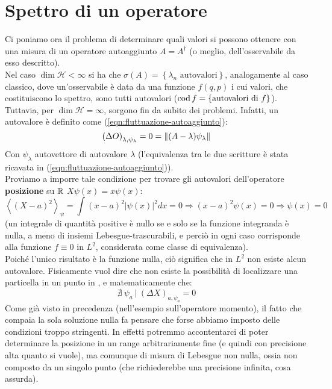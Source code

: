 \documentclass[../../FisicaTeorica.tex]{subfiles}
\begin{document}
\section{Spettro di un operatore}
Ci poniamo ora il problema di determinare quali valori si possono ottenere con una misura di un operatore autoaggiunto $A=A^\dag$ (o meglio, dell'osservabile da esso descritto).\\
Nel caso $\dim{\mathcal{H}}<\infty$ si ha che $\sigma \left(A\right)= \left\{\lambda_n\text{ autovalori}\right\}$, analogamente al caso classico, dove un'osservabile è data da una funzione $f(q,p)$ i cui valori, che costituiscono lo spettro, sono tutti autovalori ($\operatorname{cod} f = \{\text{autovalori di }f\}$).\\
Tuttavia, per $\dim{\mathcal{H}}=\infty$, sorgono fin da subito dei problemi.  Infatti, un autovalore è definito come (\ref{eqn:fluttuazione-autoaggiunto}):
\[
\left(\Delta O\right)_{\lambda,\psi_\lambda}=0 = \left\lVert(A-\lambda)\psi_\lambda\right\rVert
\]
Con $\psi_\lambda$ autovettore di autovalore $\lambda$ 
(l'equivalenza tra le due scritture è stata ricavata in (\ref{eqn:fluttuazione-autoaggiunto})).\\
Proviamo a imporre tale condizione per trovare gli autovalori dell'operatore \textbf{posizione} su $\mathbb{R}$ $X\psi \left(x\right)=x\psi (x)$:
\[
\left\langle\left(X-a\right)^2\right\rangle_\psi=\int \left(x-a\right)^2\left|\psi\left(x\right)\right|^2dx=0\Rightarrow \left(x-a\right)^2\psi \left(x\right)=0\Rightarrow  \psi \left(x\right)=0 
\]
(un integrale di quantità positive è nullo se e solo se la funzione integranda è nulla, a meno di insiemi Lebesgue-trascurabili, e perciò in ogni caso corrisponde alla funzione $f\equiv 0$ in $L^2$, considerata come classe di equivalenza).\\
Poiché l'unico risultato è la funzione nulla, ciò significa che in $L^2$ non esiste alcun autovalore. Fisicamente vuol dire che non esiste la possibilità di localizzare una particella in un punto in \MQ, e matematicamente che:
\[
\nexists\> \psi_a\>|\> \left(\Delta X\right)_{a,\psi_a}=0
\]
Come già visto in precedenza (nell'esempio sull'operatore momento), il fatto che compaia la sola soluzione nulla fa pensare che forse abbiamo imposto delle condizioni troppo stringenti. In effetti potremmo accontentarci di poter determinare la posizione in un range arbitrariamente fine (e quindi con precisione alta quanto si vuole), ma comunque di misura di Lebesgue non nulla, ossia non composto da un singolo punto (che richiederebbe una precisione infinita, cosa assurda).\\
\end{document}
